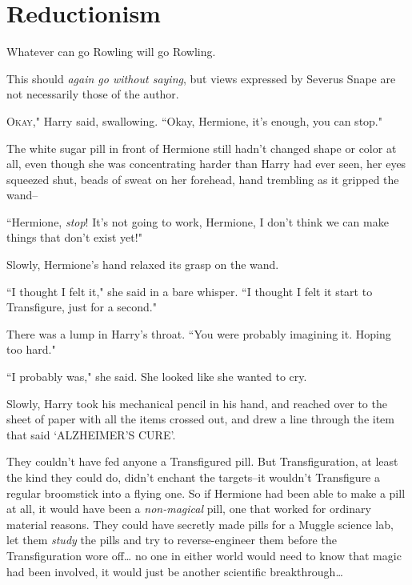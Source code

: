 \chapter{Reductionism}

\begin{chapterOpeningAuthorNote}
Whatever can go Rowling will go Rowling.

This should \emph{again go without saying}, but views expressed by Severus Snape are not necessarily those of the author.
\end{chapterOpeningAuthorNote}

\lettrine[ante=``]{O}{kay,"} Harry said, swallowing. ``Okay, Hermione, it's enough, you can stop."

The white sugar pill in front of Hermione still hadn't changed shape or color at all, even though she was concentrating harder than Harry had ever seen, her eyes squeezed shut, beads of sweat on her forehead, hand trembling as it gripped the wand\---

``Hermione, \emph{stop}! It's not going to work, Hermione, I don't think we can make things that don't exist yet!"

Slowly, Hermione's hand relaxed its grasp on the wand.

``I thought I felt it," she said in a bare whisper. ``I thought I felt it start to Transfigure, just for a second."

There was a lump in Harry's throat. ``You were probably imagining it. Hoping too hard."

``I probably was," she said. She looked like she wanted to cry.

Slowly, Harry took his mechanical pencil in his hand, and reached over to the sheet of paper with all the items crossed out, and drew a line through the item that said `ALZHEIMER'S CURE'.

They couldn't have fed anyone a Transfigured pill. But Transfiguration, at least the kind they could do, didn't enchant the targets\---it wouldn't Transfigure a regular broomstick into a flying one. So if Hermione had been able to make a pill at all, it would have been a \emph{non-magical} pill, one that worked for ordinary material reasons. They could have secretly made pills for a Muggle science lab, let them \emph{study} the pills and try to reverse-engineer them before the Transfiguration wore off{\ldots} no one in either world would need to know that magic had been involved, it would just be another scientific breakthrough{\ldots}

